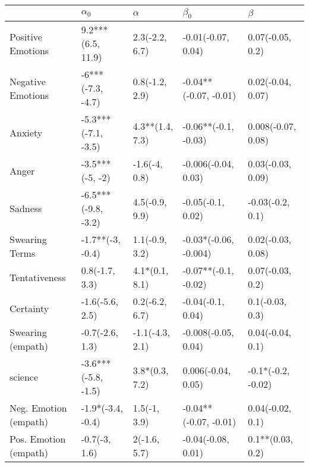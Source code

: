\begin{tabular}{lllll}
\toprule
{} &           $\alpha_0$ &         $\alpha$ &              $\beta_0$ &             $\beta$ \\
\midrule
Positive Emotions     &    9.2***(6.5, 11.9) &   2.3(-2.2, 6.7) &     -0.01(-0.07, 0.04) &    0.07(-0.05, 0.2) \\
Negative Emotions     &    -6***(-7.3, -4.7) &   0.8(-1.2, 2.9) &  -0.04**(-0.07, -0.01) &   0.02(-0.04, 0.07) \\
Anxiety               &  -5.3***(-7.1, -3.5) &  4.3**(1.4, 7.3) &   -0.06**(-0.1, -0.03) &  0.008(-0.07, 0.08) \\
Anger                 &      -3.5***(-5, -2) &    -1.6(-4, 0.8) &    -0.006(-0.04, 0.03) &   0.03(-0.03, 0.09) \\
Sadness               &  -6.5***(-9.8, -3.2) &   4.5(-0.9, 9.9) &      -0.05(-0.1, 0.02) &    -0.03(-0.2, 0.1) \\
Swearing Terms        &     -1.7**(-3, -0.4) &   1.1(-0.9, 3.2) &  -0.03*(-0.06, -0.004) &   0.02(-0.03, 0.08) \\
Tentativeness         &       0.8(-1.7, 3.3) &   4.1*(0.1, 8.1) &   -0.07**(-0.1, -0.02) &    0.07(-0.03, 0.2) \\
Certainty             &      -1.6(-5.6, 2.5) &   0.2(-6.2, 6.7) &      -0.04(-0.1, 0.04) &     0.1(-0.03, 0.3) \\
Swearing (empath)     &      -0.7(-2.6, 1.3) &  -1.1(-4.3, 2.1) &    -0.008(-0.05, 0.04) &    0.04(-0.04, 0.1) \\
science               &  -3.6***(-5.8, -1.5) &   3.8*(0.3, 7.2) &     0.006(-0.04, 0.05) &  -0.1*(-0.2, -0.02) \\
Neg. Emotion (empath) &    -1.9*(-3.4, -0.4) &     1.5(-1, 3.9) &  -0.04**(-0.07, -0.01) &    0.04(-0.02, 0.1) \\
Pos. Emotion (empath) &        -0.7(-3, 1.6) &     2(-1.6, 5.7) &     -0.04(-0.08, 0.01) &    0.1**(0.03, 0.2) \\
\bottomrule
\end{tabular}
